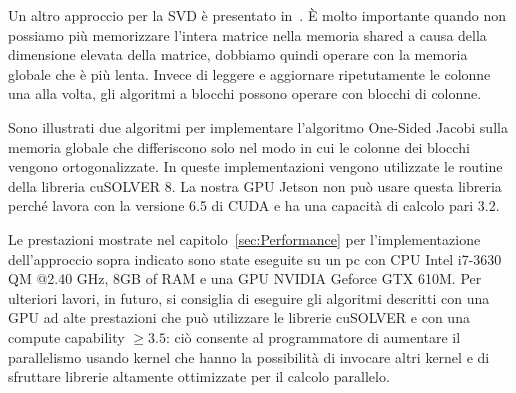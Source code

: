 Un altro approccio per la SVD è presentato in~\cite{Boukaram:SVD}. È molto importante quando non possiamo più memorizzare l'intera matrice nella memoria shared a causa della dimensione elevata della matrice, dobbiamo quindi operare con la memoria globale che è più lenta. Invece di leggere e aggiornare ripetutamente le colonne una alla volta, gli algoritmi a blocchi possono operare con blocchi di colonne.

Sono illustrati due algoritmi per implementare l'algoritmo One-Sided Jacobi sulla memoria globale che differiscono solo nel modo in cui le colonne dei blocchi vengono ortogonalizzate. In queste implementazioni vengono utilizzate le routine della libreria cuSOLVER 8. La nostra GPU Jetson non può usare questa libreria perché lavora con la versione 6.5 di CUDA e ha una capacità di calcolo pari 3.2.

Le prestazioni mostrate nel capitolo~\ref{sec:Performance} per l'implementazione dell'approccio sopra indicato sono state eseguite su un pc con CPU Intel i7-3630 QM @2.40 GHz, 8GB of RAM e una GPU NVIDIA Geforce GTX 610M. Per ulteriori lavori, in futuro, si consiglia di eseguire gli algoritmi descritti con una GPU ad alte prestazioni che può utilizzare le librerie cuSOLVER e con una compute capability $\geq 3.5$: ciò consente al programmatore di aumentare il parallelismo usando kernel che hanno la possibilità di invocare altri kernel e di sfruttare librerie altamente ottimizzate per il calcolo parallelo.